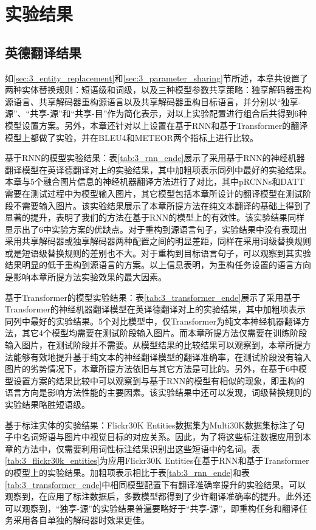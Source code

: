 \section{实验结果}

\subsection{英德翻译结果}

如\ref{sec:3_entity_replacement}和\ref{sec:3_parameter_sharing}节所述，本章共设置了两种实体替换规则：短语级和词级，以及三种模型参数共享策略：独享解码器重构源语言、共享解码器重构源语言以及共享解码器重构目标语言，并分别以“独享-源”、“共享-源”和“共享-目”作为简化表示，对以上实验配置进行组合后共得到6种模型设置方案。另外，本章还针对以上设置在基于RNN和基于Transformer的翻译模型上都做了实验，并在BLEU4\cite{42_papineni-etal-2002-bleu}和METEOR\cite{46_denkowski-lavie-2014-meteor}两个指标上进行比较。

{\sffamily 基于RNN的模型实验结果：}表\ref{tab:3_rnn_ende}展示了采用基于RNN的神经机器翻译模型在英译德翻译对上的实验结果，其中加粗项表示同列中最好的实验结果。本章与5个融合图片信息的神经机器翻译方法进行了对比，其中pRCNNs和DATT需要在测试过程中为模型输入图片，其它模型包括本章所设计的翻译模型在测试阶段不需要输入图片。该实验结果展示了本章所提方法在纯文本翻译的基础上得到了显著的提升，表明了我们的方法在基于RNN的模型上的有效性。该实验结果同样显示出了6中实验方案的优缺点。对于重构到源语言句子，实验结果中没有表现出采用共享解码器或独享解码器两种配置之间的明显差距，同样在采用词级替换规则或是短语级替换规则的差别也不大。对于重构到目标语言句子，可以观察到其实验结果明显的低于重构到源语言的方案。以上信息表明，为重构任务设置的语言方向是影响本章所提方法实验效果的最大因素。


{\sffamily 基于Transformer的模型实验结果：}表\ref{tab:3_transformer_ende}展示了采用基于Transformer的神经机器翻译模型在英译德翻译对上的实验结果，其中加粗项表示同列中最好的实验结果。5个对比模型中，仅Transformer为纯文本神经机器翻译方法，其它4个模型均需要在测试阶段输入图片。而本章所提方法仅需要在训练阶段输入图片，在测试阶段并不需要。从模型结果的比较结果可以观察到，本章所提方法能够有效地提升基于纯文本的神经翻译模型的翻译准确率，在测试阶段没有输入图片的劣势情况下，本章所提方法依旧与其它方法是可比的。另外，在基于6中模型设置方案的结果比较中可以观察到与基于RNN的模型有相似的现象，即重构的语言方向是影响方法性能的主要因素。该实验结果中还可以发现，词级替换规则的实验结果略胜短语级。


{\sffamily 基于标注实体的实验结果：}Flickr30K Entities数据集为Multi30K数据集标注了句子中名词短语与图片中视觉目标的对应关系。因此，为了将这些标注数据应用到本章的方法中，仅需要利用词性标注结果识别出这些短语中的名词。表\ref{tab:3_flickr30k_entities}为应用Flickr30K Entities在基于RNN和基于Transformer的模型上的实验结果。加粗项表示相比于表\ref{tab:3_rnn_ende}和表\ref{tab:3_transformer_ende}中相同模型配置下有翻译准确率提升的实验结果。可以观察到，在应用了标注数据后，多数模型都得到了少许翻译准确率的提升。此外还可以观察到，“独享-源”的实验结果普遍要略好于“共享-源”，即重构任务和翻译任务采用各自单独的解码器时效果更佳。

